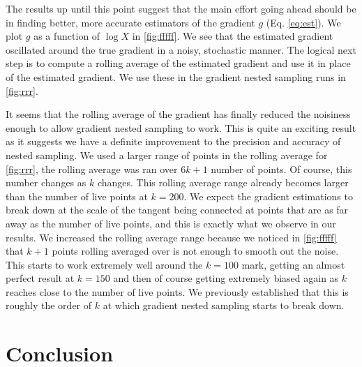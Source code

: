 The results up until this point suggest that the main effort going ahead should be in finding better, more accurate estimators of the gradient $g$ (Eq. \ref{eq:est}). We plot $g$ as a function of $\log X$ in \cref{fig:fffff}. We see that the estimated gradient oscillated around the true gradient in a noisy, stochastic manner. The logical next step is to compute a rolling average of the estimated gradient and use it in place of the estimated gradient. We use these in the gradient nested sampling runs in \cref{fig:rrr}.





It seems that the rolling average of the gradient has finally reduced the noisiness enough to allow gradient nested sampling to work. This is quite an exciting result as it suggests we have a definite improvement to the precision and accuracy of nested sampling. We used a larger range of points in the rolling average for \cref{fig:rrr}, the rolling average was ran over $6k+1$ number of points. Of course, this number changes as $k$ changes. This rolling average range already becomes larger than the number of live points at $k=200$. We expect the gradient estimations to break down at the scale of the tangent being connected at points that are as far away as the number of live points, and this is exactly what we observe in our results. We increased the rolling average range because we noticed in \cref{fig:fffff} that $k+1$ points rolling averaged over is not enough to smooth out the noise. This starts to work extremely well around the $k=100$ mark, getting an almost perfect result at $k=150$ and then of course getting extremely biased again as $k$ reaches close to the number of live points. We previously established that this is roughly the order of $k$ at which gradient nested sampling starts to break down. 


\section{Conclusion}


